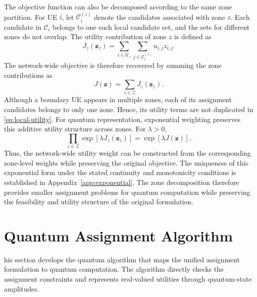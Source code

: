 \documentclass[journal]{IEEEtran}
\begin{document}
{{The objective function can also be decomposed according to the same zone partition. 
For UE $i$, let $\mathcal{C}_i^{(z)}$ denote the candidates associated with zone $z$. Each candidate in $\mathcal{C}_i$ belongs to one such local
candidate set, and the sets for different zones do not overlap. The utility contribution of zone $z$ is defined as
\begin{equation}
J_z(\bm z_z)=\sum_{i\in\mathcal{U}_z}\sum_{j\in\mathcal{C}_i^{(z)}}u_{i,j}z_{i,j}.
\label{eq:zone-utility}
\end{equation}
The network-wide objective is therefore recovered by summing the zone contributions as
\begin{equation}
J(\bm z)=\sum_{z\in\mathcal{Z}}J_z(\bm z_z).
\label{eq:local-utility}
\end{equation}
Although a boundary UE appears in multiple zones, each of its
assignment candidates belongs to only one zone. Hence, its utility
terms are not duplicated in \eqref{eq:local-utility}.
For quantum representation, exponential weighting preserves this
additive utility structure across zones. For $\lambda>0$,
\begin{equation}
\prod_{z\in\mathcal{Z}}
\exp\!\left[\lambda J_z(\bm z_z)\right]
=\exp\!\left[\lambda J(\bm z)\right].
\label{eq:composability}
\end{equation}
Thus, the network-wide utility weight can be constructed from the
corresponding zone-level weights while preserving the original
objective. The uniqueness of this exponential form under the stated
continuity and monotonicity conditions is established in
Appendix~\ref{app:exponential}.
The zone decomposition therefore provides smaller assignment problems
for quantum computation while preserving the feasibility and utility
structure of the original formulation.

\section{Quantum Assignment Algorithm}
\label{sec:circuit}

his section develops the quantum algorithm that maps the unified assignment formulation to quantum computation. The algorithm directly
checks the assignment constraints and represents real-valued utilities through quantum-state amplitudes.

\vspace{-3mm}
}}
\end{document}
